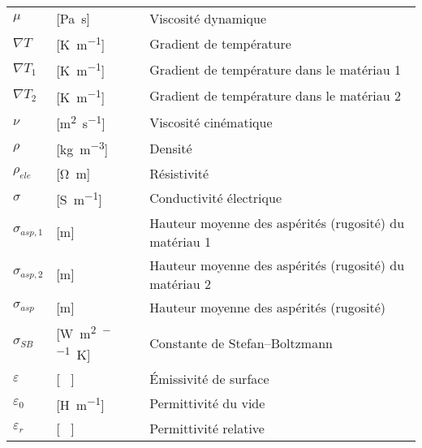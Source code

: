 \begin{longtable}{l p{2.5cm} p{4in}}
	$\mu$            & [\si{\pascal\second}]                               & Viscosité dynamique                                          \\
	$\nabla T$       & [\si{\kelvin\per\metre}]                            & Gradient de température                                      \\
	$\nabla T_1$     & [\si{\kelvin\per\metre}]                            & Gradient de température dans le matériau 1                   \\
	$\nabla T_2$     & [\si{\kelvin\per\metre}]                            & Gradient de température dans le matériau 2                   \\
	$\nu$            & [\si{\square\metre\per\second}]                     & Viscosité cinématique                                        \\
	$\rho$           & [\si{\kilogram\per\cubic\metre}]                    & Densité                                                      \\
	$\rho_{ele}$     & [\si{\ohm\metre}]                                   & Résistivité                                                  \\
	$\sigma$         & [\si{\siemens\per\metre}]                           & Conductivité électrique                                      \\
	$\sigma_{asp,1}$ & [\si{\metre}]                                       & Hauteur moyenne des aspérités (rugosité) du matériau 1       \\
	$\sigma_{asp,2}$ & [\si{\metre}]                                       & Hauteur moyenne des aspérités (rugosité) du matériau 2       \\
	$\sigma_{asp}$   & [\si{\metre}]                                       & Hauteur moyenne des aspérités (rugosité)                     \\
	$\sigma_{SB}$    & [\si{\watt\per\square\metre\per\raiseto{4}\kelvin}] & Constante de Stefan–Boltzmann                                \\
	$\varepsilon$    & [ \ ]                                               & Émissivité de surface                                        \\
	$\varepsilon_0$  & [\si{\henry\per\metre}]                             & Permittivité du vide                                         \\
	$\varepsilon_r$  & [ \ ]                                               & Permittivité relative                                        \\

\end{longtable}
